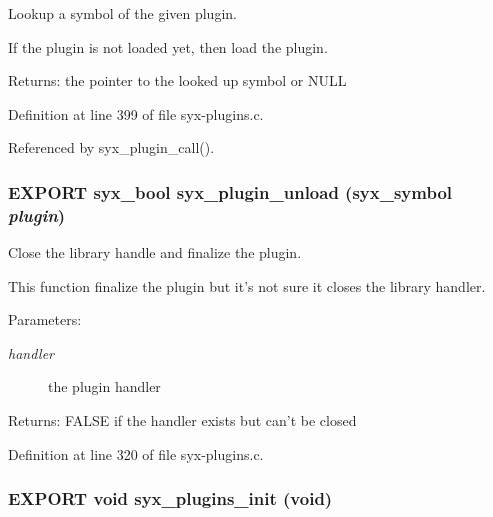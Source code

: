 Lookup a symbol of the given plugin.

If the plugin is not loaded yet, then load the plugin.

\begin{Desc}
\item[Returns:]the pointer to the looked up symbol or NULL \end{Desc}


Definition at line 399 of file syx-plugins.c.

Referenced by syx\_\-plugin\_\-call().\hypertarget{syx-plugins_8h_de5e4570fa91b561d987fcd4d95d4bc2}{
\subsubsection{\setlength{\rightskip}{0pt plus 5cm}EXPORT {\bf syx\_\-bool} syx\_\-plugin\_\-unload ({\bf syx\_\-symbol} {\em plugin})}}
\label{syx-plugins_8h_de5e4570fa91b561d987fcd4d95d4bc2}


Close the library handle and finalize the plugin.

This function finalize the plugin but it's not sure it closes the library handler.

\begin{Desc}
\item[Parameters:]
\begin{description}
\item[{\em handler}]the plugin handler \end{description}
\end{Desc}
\begin{Desc}
\item[Returns:]FALSE if the handler exists but can't be closed \end{Desc}


Definition at line 320 of file syx-plugins.c.\hypertarget{syx-plugins_8h_7abf4245abf9341dc6caca814ab9b43a}{
\subsubsection{\setlength{\rightskip}{0pt plus 5cm}EXPORT void syx\_\-plugins\_\-init (void)}}
\label{syx-plugins_8h_7abf4245abf9341dc6caca814ab9b43a}


